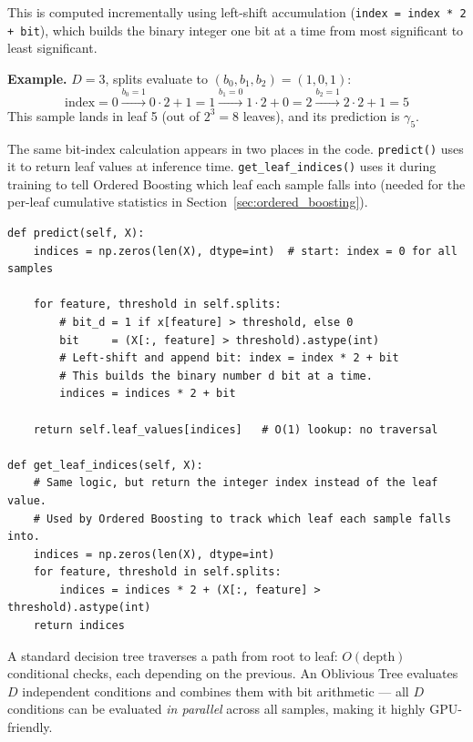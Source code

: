 \documentclass[11pt, a4paper]{article}
\begin{document}
This is computed incrementally using left-shift accumulation
(\texttt{index = index * 2 + bit}), which builds the binary integer
one bit at a time from most significant to least significant.

\textbf{Example.} $D=3$, splits evaluate to $(b_0, b_1, b_2) = (1, 0, 1)$:
\[
\mathrm{index} = 0
\xrightarrow{b_0=1} 0\cdot 2 + 1 = 1
\xrightarrow{b_1=0} 1\cdot 2 + 0 = 2
\xrightarrow{b_2=1} 2\cdot 2 + 1 = 5
\]
This sample lands in leaf 5 (out of $2^3 = 8$ leaves),
and its prediction is $\gamma_5$.

The same bit-index calculation appears in two places in the code.
\texttt{predict()} uses it to return leaf values at inference time.
\texttt{get\_leaf\_indices()} uses it during training to tell Ordered Boosting
which leaf each sample falls into (needed for the per-leaf cumulative statistics
in Section~\ref{sec:ordered_boosting}).

\begin{listing}[H]
\caption{Prediction via bit-index (\texttt{tree.py})}
\begin{verbatim}
def predict(self, X):
    indices = np.zeros(len(X), dtype=int)  # start: index = 0 for all samples

    for feature, threshold in self.splits:
        # bit_d = 1 if x[feature] > threshold, else 0
        bit     = (X[:, feature] > threshold).astype(int)
        # Left-shift and append bit: index = index * 2 + bit
        # This builds the binary number d bit at a time.
        indices = indices * 2 + bit

    return self.leaf_values[indices]   # O(1) lookup: no traversal

def get_leaf_indices(self, X):
    # Same logic, but return the integer index instead of the leaf value.
    # Used by Ordered Boosting to track which leaf each sample falls into.
    indices = np.zeros(len(X), dtype=int)
    for feature, threshold in self.splits:
        indices = indices * 2 + (X[:, feature] > threshold).astype(int)
    return indices
\end{verbatim}
\end{listing}

A standard decision tree traverses a path from root to leaf:
$O(\text{depth})$ conditional checks, each depending on the previous.
An Oblivious Tree evaluates $D$ independent conditions and combines them
with bit arithmetic --- all $D$ conditions can be evaluated \emph{in parallel}
across all samples, making it highly GPU-friendly.
\end{document}
